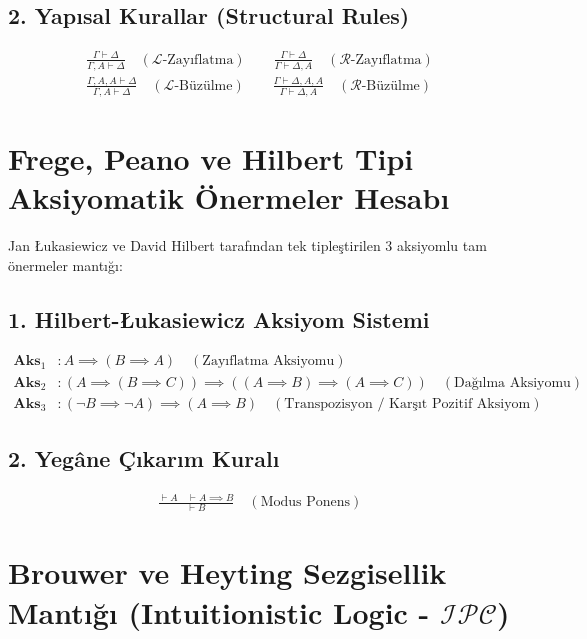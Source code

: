 \documentclass[11pt, a4paper]{article}
\begin{document}
\subsection{2. Yapısal Kurallar (Structural Rules)}
\begin{align}
\frac{\Gamma \vdash \Delta}{\Gamma, A \vdash \Delta} \quad (\mathcal{L}\text{-Zayıflatma}) \qquad
\frac{\Gamma \vdash \Delta}{\Gamma \vdash \Delta, A} \quad (\mathcal{R}\text{-Zayıflatma}) \\
\frac{\Gamma, A, A \vdash \Delta}{\Gamma, A \vdash \Delta} \quad (\mathcal{L}\text{-Büzülme}) \qquad
\frac{\Gamma \vdash \Delta, A, A}{\Gamma \vdash \Delta, A} \quad (\mathcal{R}\text{-Büzülme})
\end{align}

\section{Frege, Peano ve Hilbert Tipi Aksiyomatik Önermeler Hesabı}

Jan Łukasiewicz ve David Hilbert tarafından tek tipleştirilen 3 aksiyomlu tam önermeler mantığı:

\subsection{1. Hilbert-Łukasiewicz Aksiyom Sistemi}
\begin{align}
\mathbf{Aks}_1 &: A \implies (B \implies A) \quad (\text{Zayıflatma Aksiyomu}) \\
\mathbf{Aks}_2 &: (A \implies (B \implies C)) \implies ((A \implies B) \implies (A \implies C)) \quad (\text{Dağılma Aksiyomu}) \\
\mathbf{Aks}_3 &: (\neg B \implies \neg A) \implies (A \implies B) \quad (\text{Transpozisyon / Karşıt Pozitif Aksiyom})
\end{align}

\subsection{2. Yegâne Çıkarım Kuralı}
\begin{align}
\frac{\vdash A \quad \vdash A \implies B}{\vdash B} \quad (\text{Modus Ponens})
\end{align}

\section{Brouwer ve Heyting Sezgisellik Mantığı (Intuitionistic Logic - $\mathcal{I}\mathcal{P}\mathcal{C}$)}
\end{document}
